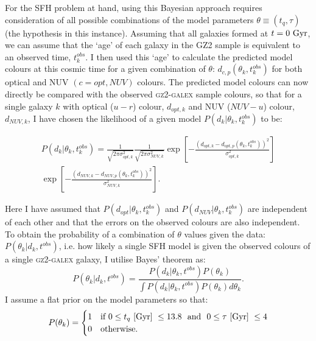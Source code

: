 For the SFH problem at hand, using this Bayesian approach requires consideration of all possible combinations of the model parameters $\theta \equiv (t_{q}, \tau)$ (the hypothesis in this instance). Assuming that all galaxies formed at $t=0~\rm{Gyr}$, we can assume that the `age' of each galaxy in the GZ2 sample is equivalent to an observed time, $t^{obs}_{k}$. I then used this  `age' to calculate the predicted model colours at this cosmic time for a given combination of $\theta$: $d_{c,p}(\theta_k, t^{obs}_{k})$ for both optical and NUV $(c={opt,NUV})$ colours. The predicted model colours can now directly be compared with the observed \textsc{gz2-galex} sample colours, so that for a single galaxy $k$ with optical ($u-r$) colour, $d_{opt, k}$ and NUV ($NUV-u$) colour, $d_{NUV,k}$,  I have chosen the likelihood of a given model $P(d_{k}|\theta_k, t^{obs}_{k})$ to be:


\begin{equation}\label{like}
\begin{split}
P(d_{k}|\theta_k, t^{obs}_{k}) = \frac{1}{\sqrt{2\pi\sigma_{opt, k}^2}}\frac{1}{\sqrt{2\pi\sigma_{NUV, k}^2}} \exp{\left[ - \frac{(d_{opt, k} - d_{opt, p}(\theta_k, t_{k}^{obs}))^2}{\sigma_{opt, k}^2} \right]} \\ \exp{\left[ - \frac{(d_{NUV, k} - d_{NUV, p}(\theta_k, t_{k}^{obs}))^2}{\sigma_{NUV, k}^2} \right]}.
\end{split}
\end{equation}


Here I have assumed that $P(d_{opt}|\theta_k, t^{obs}_{k})$ and $P(d_{NUV}|\theta_k, t^{obs}_{k})$ are independent of each other and that the errors on the observed colours are also independent. To obtain the probability of a combination of $\theta$ values given the data: $P(\theta_k|d_k, t^{obs})$, i.e. how likely a single SFH model is  given the observed colours of a single \textsc{gz2-galex} galaxy, I utilise Bayes' theorem as:
 \begin{equation}\label{big}
P(\theta_k|d_k, t^{obs}) = \frac{P(d_k|\theta_k, t^{obs})P(\theta_k)}{\int P(d_k |\theta_k, t^{obs})P(\theta_k) d\theta_k}.
\end{equation}
I assume a flat prior on the model parameters so that:
\begin{equation}\label{prior}
P(\theta_k) =
\begin{cases}
1 & \text{if } 0 \leq t_q ~\rm{[Gyr]}~ \leq 13.8 ~  \text{ and } ~ 0 \leq \tau  ~\rm{[Gyr]}~ \leq 4\\
0 & \text{otherwise.} \\
\end{cases}
\end{equation}

